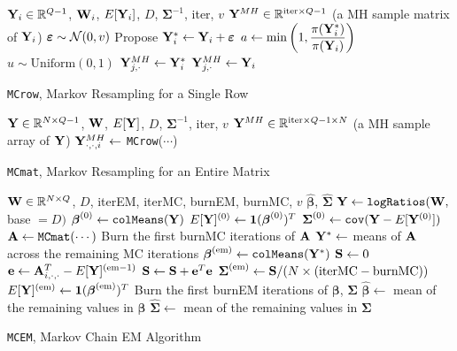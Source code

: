 \documentclass{template}
\begin{document}
\FloatBarrier 
\begin{algorithm}[ht!]
\begin{algorithmic}[1]
\Input $\mathbf{Y}_i\in\mathbb{R}^{Q-1}$, $\mathbf{W}_i$, $E[\mathbf{Y}_i]$, $D$, $\boldsymbol{\Sigma}^{-1}$, iter, $v$
\Output $\mathbf{Y}^{MH}\in\mathbb{R}^{\text{iter}\times Q-1}$ (a MH sample matrix of $\mathbf{Y}_i$)
\State $\boldsymbol{\varepsilon} \sim \mathcal{N}(0,v)$
\State Propose $\mathbf{Y}_i^* \gets \mathbf{Y}_i+\boldsymbol{\varepsilon}$
\State $a \gets \min\left(1,\dfrac{\pi(\mathbf{Y}_i^*)}{\pi(\mathbf{Y}_i)}\right)$
\State $u \sim \text{Uniform}(0,1)$
\State $\mathbf{Y}^{MH}_{j,\cdot} \gets \mathbf{Y}_i^*$
\Else 
\State $\mathbf{Y}^{MH}_{j,\cdot} \gets \mathbf{Y}_i$
\EndIf
\EndFor
{}
\end{algorithmic}
\caption{\texttt{MCrow}, Markov Resampling for a Single Row}
\end{algorithm}


\begin{algorithm}[ht!]
\begin{algorithmic}[1]
\Input $\mathbf{Y}\in\mathbb{R}^{N\times Q-1}$, $\mathbf{W}$, $E[\mathbf{Y}]$, $D$, $\boldsymbol{\Sigma}^{-1}$, iter, $v$
\Output $\mathbf{Y}^{MH}\in\mathbb{R}^{\text{iter}\times Q-1\times N}$ (a MH sample array of $\mathbf{Y}$)
\State $\mathbf{Y}^{MH}_{\cdot,\cdot,i} \gets$ \texttt{MCrow}($\cdots$)
\EndFor
{}
\end{algorithmic}
\caption{\texttt{MCmat}, Markov Resampling for an Entire Matrix}
\end{algorithm}


\begin{algorithm}[ht!]
\begin{algorithmic}[1]
\Input  $\mathbf{W}\in\mathbb{R}^{N\times Q}$, $D$,  iterEM, iterMC, burnEM, burnMC, $v$
\Output $\hat{\boldsymbol{\beta}}$, $\hat{\boldsymbol{\Sigma}}$
\State $\mathbf{Y}\gets \texttt{logRatios}(\mathbf{W},$ base $=D)$
\State $\boldsymbol{\beta}^{(0)} \gets \texttt{colMeans}(\mathbf{Y})$
\State $E[\mathbf{Y}]^{(0)} \gets \mathbf{1}(\boldsymbol{\beta}^{(0)})^T$
\State $\boldsymbol{\Sigma}^{(0)} \gets \texttt{cov}(\mathbf{Y}-E[\mathbf{Y}^{(0)}])$
\State $\mathbf{A}\gets \texttt{MCmat}(\cdots)$
\State Burn the first burnMC iterations of $\mathbf{A}$
\State $\mathbf{Y}^*\gets$ means of $\mathbf{A}$ across the remaining MC iterations
\State $\boldsymbol{\beta}^{(\text{em})} \gets \texttt{colMeans}(\mathbf{Y}^*)$
\State $\mathbf{S}\gets 0$
\State $\mathbf{e}\gets \mathbf{A}_{i,\cdot,\cdot}^T-E[\mathbf{Y}]^{(\text{em}-1)}$
\State $\mathbf{S}\gets \mathbf{S}+\mathbf{e}^T\mathbf{e}$
\EndFor
\State $\boldsymbol{\Sigma}^{(\text{em})}\gets \mathbf{S}/(N\times (\text{iterMC}-\text{burnMC}))$
\State $E[\mathbf{Y}]^{(\text{em})} \gets \mathbf{1}(\boldsymbol{\beta}^{(\text{em})})^T$
\EndFor
\State Burn the first burnEM iterations of $\boldsymbol{\beta}$, $\boldsymbol{\Sigma}$
\State $\hat{\boldsymbol{\beta}}\gets$ mean of the remaining values in $\boldsymbol{\beta}$
\State $\hat{\boldsymbol{\Sigma}}\gets$ mean of the remaining values in $\boldsymbol{\Sigma}$
\end{algorithmic}
\caption{\texttt{MCEM}, Markov Chain EM Algorithm}
\end{algorithm}


\FloatBarrier

\end{document}
